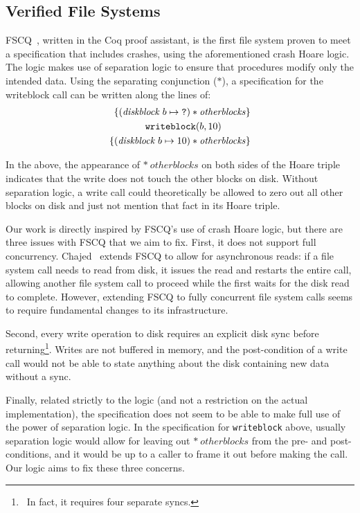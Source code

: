 \subsection{Verified File Systems}
FSCQ~\cite{chen2015using}, written in the Coq proof assistant, is the
first file
system proven to meet a specification that includes crashes, using the
aforementioned crash Hoare logic.
The logic makes use of separation logic to
ensure that procedures modify only the intended data.
Using the separating
conjunction ($\ast$), a specification for the writeblock call can be written
along the lines of:
\begin{align*}
    \left\{ (\mathit{diskblock}\;b \mapsto \texttt{?}) \ast \mathit{otherblocks} \right\} \\ 
    \texttt{writeblock}(b, 10)\hspace{30px} \\
    \left\{ (\mathit{diskblock}\;b \mapsto 10) \ast \mathit{otherblocks} \right\}
\end{align*}

In the above, the appearance of $\ast~otherblocks$ on both sides of the Hoare
triple indicates that the write does not touch the other blocks on
disk.
Without
separation logic, a write call could theoretically be allowed to zero out all
other blocks on disk and just not mention that fact in its Hoare triple.

Our work is directly inspired by FSCQ's use of crash Hoare logic, but there are
three issues with FSCQ that we aim to fix.
First, it does not support full
concurrency.
Chajed~\cite{chajed2017verifying} extends FSCQ to allow for
asynchronous reads: if a file system call needs to read from disk, it issues the
read and restarts the entire call, allowing another file system call to proceed
while the first waits for the disk read to complete.
However, extending
FSCQ to fully concurrent file system calls seems to require fundamental changes
to its infrastructure.

Second, every write operation to disk requires an explicit disk sync before
returning\footnote{\
In fact, it requires four separate syncs.
}.
Writes are not buffered in memory, and the post-condition of a write call would
not be able to state anything about the disk containing new data without a sync.

Finally, related strictly to the logic (and not a restriction on the actual
implementation), the specification does not seem to be able to make full use of
the power of separation logic.
In the specification for \texttt{writeblock}
above, usually separation logic would allow for leaving out $\ast~otherblocks$
from the pre- and post-conditions, and it would be up to a caller to frame it
out before making the call.
Our logic aims to fix these three concerns.


